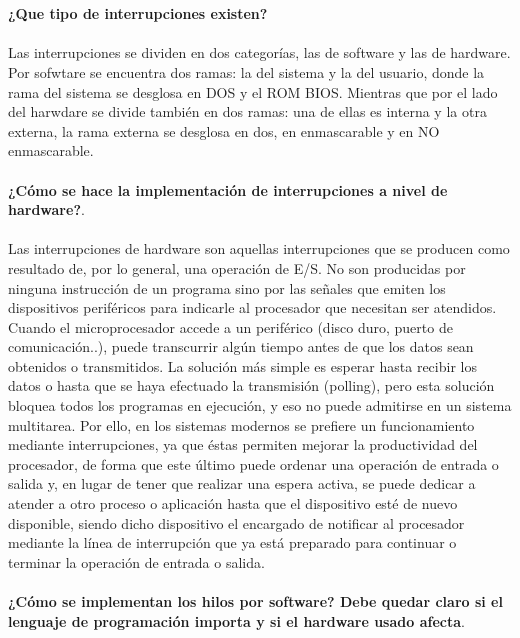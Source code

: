 \documentclass[12pt]{article}
\begin{document}
\noindent\\
\\
\textbf{¿Que tipo de interrupciones existen?}\\
\\
Las interrupciones se dividen en dos categorías, las de software y las de hardware.
Por sofwtare se encuentra dos ramas: la del sistema y la del usuario, donde la rama del sistema se desglosa en DOS y el ROM BIOS.
Mientras que por el lado del harwdare se divide también en dos ramas: una de ellas es interna y la otra externa, la rama externa se desglosa en dos, en enmascarable y en NO enmascarable.
\\
\noindent
\\
\textbf{¿Cómo se hace la implementación de interrupciones a nivel de hardware?}.\\
\noindent
\\ 
Las interrupciones de hardware son aquellas interrupciones que se producen como resultado de, por lo general, una operación de E/S. No son producidas por ninguna instrucción de un programa sino por las señales que emiten los dispositivos periféricos para indicarle al procesador que necesitan ser atendidos.
Cuando el microprocesador accede a un periférico (disco duro, puerto de comunicación..), puede transcurrir algún tiempo antes de que los datos sean obtenidos o transmitidos. La solución más simple es esperar hasta recibir los datos o hasta que se haya efectuado la transmisión (polling), pero esta solución bloquea todos los programas en ejecución, y eso no puede admitirse en un sistema multitarea. Por ello, en los sistemas modernos se prefiere un funcionamiento mediante interrupciones, ya que éstas permiten mejorar la productividad del procesador, de forma que este último puede ordenar una operación de entrada o salida y, en lugar de tener que realizar una espera activa, se puede dedicar a atender a otro proceso o aplicación hasta que el dispositivo esté de nuevo disponible, siendo dicho dispositivo el encargado de notificar al procesador mediante la línea de interrupción que ya está preparado para continuar o terminar la operación de entrada o salida.\\
\noindent
\\
\textbf{¿Cómo se implementan los hilos por software? Debe quedar claro si el lenguaje de programación importa y si el hardware usado afecta}.\\
\noindent
\\
\end{document}
